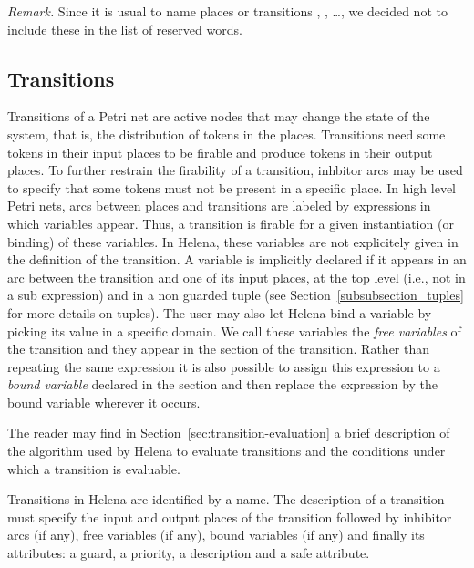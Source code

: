 {\it Remark.} Since it is usual to name places or transitions
, , \dots,  we decided not to include
these in the list of reserved words.\\

\placetypedef




\subsection{Transitions}
Transitions of a Petri net are active nodes that may change the state
of the system, that is, the distribution of tokens in the places.
Transitions need some tokens in their input places to be firable and
produce tokens in their output places.  To further restrain the
firability of a transition, inhbitor arcs may be used to specify that
some tokens must not be present in a specific place.  In high level
Petri nets, arcs between places and transitions are labeled by
expressions in which variables appear.  Thus, a transition is firable
for a given instantiation (or binding) of these variables.  In Helena,
these variables are not explicitely given in the definition of the
transition.  A variable is implicitly declared if it appears in an arc
between the transition and one of its input places, at the top level
(i.e., not in a sub expression) and in a non guarded tuple (see
Section~\ref{subsubsection_tuples} for more details on tuples).  The
user may also let Helena bind a variable by picking its value in a
specific domain.  We call these variables the {\em free variables} of
the transition and they appear in the  section of the
transition.  Rather than repeating the same expression it is also
possible to assign this expression to a {\em bound variable} declared
in the  section and then replace the expression by the bound
variable wherever it occurs.

The reader may find in Section~\ref{sec:transition-evaluation} a brief
description of the algorithm used by Helena to evaluate transitions
and the conditions under which a transition is evaluable.

Transitions in Helena are identified by a name.  The description of a
transition must specify the input and output places of the transition
followed by inhibitor arcs (if any), free variables (if any), bound
variables (if any) and finally its attributes: a guard, a priority, a
description and a safe attribute.\\


